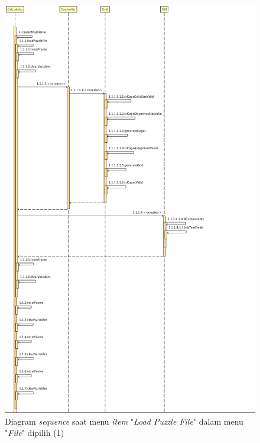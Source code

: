 \begin{figure}
\centering
\captionsetup{justification=centering}
\includegraphics[scale=0.375]{Gambar/Analisis/SequenceDiagramLoad1.png}
\caption[Diagram \textit{sequence} saat menu \textit{item} "\textit{Load Puzzle File}" dalam menu "\textit{File}" dipilih (1)]{Diagram \textit{sequence} saat menu \textit{item} "\textit{Load Puzzle File}" dalam menu "\textit{File}" dipilih (1)}
\label{fig:sequenceload1}
\end{figure}

